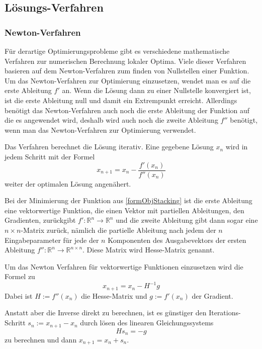 \documentclass[runningheads,a4paper]{llncs}
\begin{document}
\subsection{Lösungs-Verfahren}
\label{sec:uncon_nonlin_opt}

\subsubsection{Newton-Verfahren}

Für derartige Optimierungsprobleme gibt es verschiedene mathematische Verfahren zur numerischen Berechnung lokaler Optima. Viele dieser Verfahren basieren auf dem Newton-Verfahren zum finden von Nullstellen einer Funktion. Um das Newton-Verfahren zur Optimierung einzusetzen, wendet man es auf die erste Ableitung $f'$ an. Wenn die Lösung dann zu einer Nullstelle konvergiert ist, ist die erste Ableitung null und damit ein Extrempunkt erreicht. Allerdings benötigt das Newton-Verfahren auch noch die erste Ableitung der Funktion auf die es angewendet wird, deshalb wird auch noch die zweite Ableitung $f''$ benötigt, wenn man das Newton-Verfahren zur Optimierung verwendet.

Das Verfahren berechnet die Lösung iterativ. Eine gegebene Lösung $x_n$ wird in jedem Schritt mit der Formel
\begin{equation*}
x_{n+1} = x_n - \frac{f'(x_n)}{f''(x_n)}
\end{equation*}
weiter der optimalen Lösung angenähert.

Bei der Minimierung der Funktion aus \ref{formObjStacking} ist die erste Ableitung eine vektorwertige Funktion, die einen Vektor mit partiellen Ableitungen, den Gradienten, zurückgibt ${f': \mathbb{R}^n \rightarrow \mathbb{R}^n}$ und die zweite Ableitung gibt dann sogar eine ${n\times n}$-Matrix zurück, nämlich die partielle Ableitung nach jedem der $n$ Eingabeparameter für jede der $n$ Komponenten des Ausgabevektors der ersten Ableitung ${f'': \mathbb{R}^n \rightarrow \mathbb{R}^{n\times n}}$. Diese Matrix wird Hesse-Matrix genannt.

Um das Newton Verfahren für vektorwertige Funktionen einzusetzen wird die Formel zu
\begin{equation}
\label{eq:ndimnewtonstep}
x_{n+1} = x_n - H^{-1}g
\end{equation}
Dabei ist $H := f''(x_n)$ die Hesse-Matrix und $g := f'(x_n)$ der Gradient.

Anstatt aber die Inverse direkt zu berechnen, ist es günstiger den Iterations-Schritt ${s_n := x_{n+1} - x_n}$ durch lösen des linearen Gleichungssystems
\begin{equation}
\label{eq:newtonlineq}
Hs_n=-g
\end{equation}
zu berechnen und dann ${x_{n+1} = x_n + s_n}$.
\end{document}
